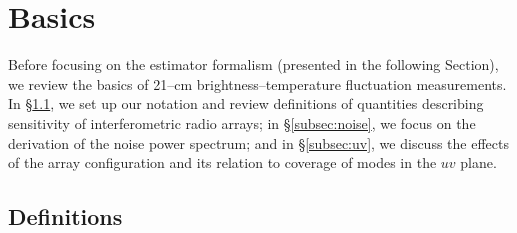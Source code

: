 \section{Basics}
\label{sec:basics}

Before focusing on the estimator formalism (presented in the following Section), we review the basics of 21--cm brightness--temperature fluctuation measurements. In \S\ref{subsec:def}, we set up our notation and review definitions of quantities describing sensitivity of interferometric radio arrays; in \S\ref{subsec:noise}, we focus on the derivation of the noise power spectrum; and in \S\ref{subsec:uv}, we discuss the effects of the array configuration and its relation to coverage of modes in the $uv$ plane. 

\subsection{Definitions}
\label{subsec:def}

